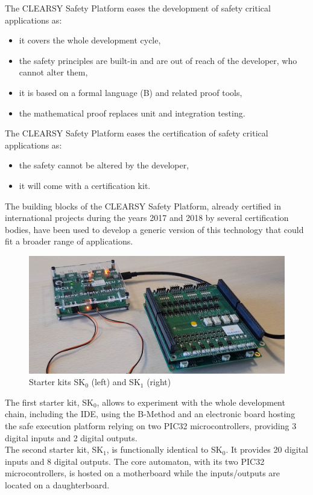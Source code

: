 The CLEARSY Safety Platform eases the development of safety critical applications as:
\begin{itemize}
    \item it covers the whole development cycle,
    \item the safety principles are built-in and are out of reach of the developer, who cannot alter them,
    \item it is based on a formal language (B) and related proof tools,
    \item the mathematical proof replaces unit and integration testing.\\
\end{itemize}

%
The CLEARSY Safety Platform eases the certification of safety critical applications as:
\begin{itemize}
    \item the safety cannot be altered by the developer,
    \item it will come with a certification kit.\\
\end{itemize}

The building blocks of the CLEARSY Safety Platform, already certified in international projects during the years 2017 and 2018 by several certification bodies, have been used to develop a generic version of this technology that could fit a broader range of applications. 

\begin{figure}[h]
\centering\includegraphics[scale=0.25]{Pictures/INTRO-SK0+SK1.jpg}
\caption{Starter kits SK$_0$ (left) and SK$_1$ (right)}
\end{figure}

The first starter kit, SK$_0$, allows to experiment with the whole development chain, including the IDE, using the B-Method and an electronic board hosting the safe execution platform relying on two PIC32 microcontrollers, providing 3 digital inputs and 2 digital outputs.\\

The second starter kit, SK$_1$, is functionally identical to SK$_0$. It provides 20 digital inputs and 8 digital outputs. The core automaton, with its two PIC32 microcontrollers, is hosted on a motherboard while the inputs/outputs are located on a daughterboard.

